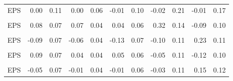 \begin{table}
\begin{tabular}[t]{lrrrrrrrrrr}
EPS & 0.00 & 0.11 & 0.00 & 0.06 & -0.01 & 0.10 & -0.02 & 0.21 & -0.01 & 0.17\\
\cellcolor{gray!10}{(Intercept)} & \cellcolor{gray!10}{0.05} & \cellcolor{gray!10}{0.14} & \cellcolor{gray!10}{0.03} & \cellcolor{gray!10}{0.08} & \cellcolor{gray!10}{0.02} & \cellcolor{gray!10}{0.11} & \cellcolor{gray!10}{0.14} & \cellcolor{gray!10}{0.30} & \cellcolor{gray!10}{-0.05} & \cellcolor{gray!10}{0.18}\\
EPS & 0.08 & 0.07 & 0.07 & 0.04 & 0.04 & 0.06 & 0.32 & 0.14 & -0.09 & 0.10\\
\cellcolor{gray!10}{(Intercept)} & \cellcolor{gray!10}{-0.05} & \cellcolor{gray!10}{0.14} & \cellcolor{gray!10}{-0.02} & \cellcolor{gray!10}{0.08} & \cellcolor{gray!10}{-0.06} & \cellcolor{gray!10}{0.15} & \cellcolor{gray!10}{-0.03} & \cellcolor{gray!10}{0.22} & \cellcolor{gray!10}{0.10} & \cellcolor{gray!10}{0.23}\\
EPS & -0.09 & 0.07 & -0.06 & 0.04 & -0.13 & 0.07 & -0.10 & 0.11 & 0.23 & 0.11\\
\cellcolor{gray!10}{(Intercept)} & \cellcolor{gray!10}{0.05} & \cellcolor{gray!10}{0.14} & \cellcolor{gray!10}{0.02} & \cellcolor{gray!10}{0.07} & \cellcolor{gray!10}{0.02} & \cellcolor{gray!10}{0.12} & \cellcolor{gray!10}{-0.02} & \cellcolor{gray!10}{0.20} & \cellcolor{gray!10}{-0.05} & \cellcolor{gray!10}{0.20}\\
EPS & 0.09 & 0.07 & 0.04 & 0.04 & 0.05 & 0.06 & -0.05 & 0.11 & -0.12 & 0.10\\
\cellcolor{gray!10}{(Intercept)} & \cellcolor{gray!10}{-0.04} & \cellcolor{gray!10}{0.12} & \cellcolor{gray!10}{-0.01} & \cellcolor{gray!10}{0.06} & \cellcolor{gray!10}{0.00} & \cellcolor{gray!10}{0.10} & \cellcolor{gray!10}{-0.02} & \cellcolor{gray!10}{0.20} & \cellcolor{gray!10}{0.09} & \cellcolor{gray!10}{0.20}\\
EPS & -0.05 & 0.07 & -0.01 & 0.04 & -0.01 & 0.06 & -0.03 & 0.11 & 0.15 & 0.12\\
\bottomrule
\end{tabular}
\end{table}
